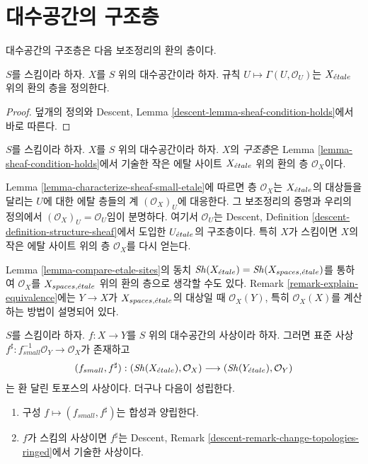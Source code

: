 \section{대수공간의 구조층}
\label{section-structure-sheaf}

\noindent
대수공간의 구조층은 다음 보조정리의 환의 층이다.

\begin{lemma}
\label{lemma-sheaf-condition-holds}
$S$를 스킴이라 하자. $X$를 $S$ 위의 대수공간이라 하자.
규칙 $U \mapsto \Gamma(U, \mathcal{O}_U)$는
$X_{\acute{e}tale}$ 위의 환의 층을 정의한다.
\end{lemma}

\begin{proof}
덮개의 정의와 Descent, Lemma
\ref{descent-lemma-sheaf-condition-holds}에서 바로 따른다.
\end{proof}

\begin{definition}
\label{definition-structure-sheaf}
$S$를 스킴이라 하자.
$X$를 $S$ 위의 대수공간이라 하자.
$X$의 {\it 구조층}은 Lemma \ref{lemma-sheaf-condition-holds}에서
기술한 작은 에탈 사이트 $X_{\acute{e}tale}$ 위의 환의 층
$\mathcal{O}_X$이다.
\end{definition}

\noindent
Lemma \ref{lemma-characterize-sheaf-small-etale}에 따르면
층 $\mathcal{O}_X$는 $X_{\acute{e}tale}$의 대상들을 달리는 $U$에 대한
에탈 층들의 계 $(\mathcal{O}_X)_U$에 대응한다.
그 보조정리의 증명과 우리의 정의에서
$(\mathcal{O}_X)_U = \mathcal{O}_U$임이 분명하다.
여기서 $\mathcal{O}_U$는 Descent, Definition
\ref{descent-definition-structure-sheaf}에서 도입한
$U_{\acute{e}tale}$의 구조층이다. 특히 $X$가 스킴이면
$X$의 작은 에탈 사이트 위의 층 $\mathcal{O}_X$를 다시 얻는다.

\medskip\noindent
Lemma \ref{lemma-compare-etale-sites}의 동치
$\mathop{\mathit{Sh}}\nolimits(X_{\acute{e}tale}) = \mathop{\mathit{Sh}}\nolimits(X_{spaces, {\acute{e}tale}})$를 통하여
$\mathcal{O}_X$를 $X_{spaces, {\acute{e}tale}}$ 위의 환의 층으로
생각할 수도 있다. Remark \ref{remark-explain-equivalence}에는
$Y \to X$가 $X_{spaces, {\acute{e}tale}}$의 대상일 때
$\mathcal{O}_X(Y)$, 특히 $\mathcal{O}_X(X)$를 계산하는 방법이
설명되어 있다.

\begin{lemma}
\label{lemma-morphism-ringed-topoi}
$S$를 스킴이라 하자.
$f : X \to Y$를 $S$ 위의 대수공간의 사상이라 하자.
그러면 표준 사상
$f^\sharp : f_{small}^{-1}\mathcal{O}_Y \to \mathcal{O}_X$가 존재하고
$$
(f_{small}, f^\sharp) :
(\mathop{\mathit{Sh}}\nolimits(X_{\acute{e}tale}), \mathcal{O}_X)
\longrightarrow
(\mathop{\mathit{Sh}}\nolimits(Y_{\acute{e}tale}), \mathcal{O}_Y)
$$
는 환 달린 토포스의 사상이다. 더구나 다음이 성립한다.
\begin{enumerate}
\item 구성 $f \mapsto (f_{small}, f^\sharp)$는 합성과 양립한다.
\item $f$가 스킴의 사상이면 $f^\sharp$는 Descent, Remark
\ref{descent-remark-change-topologies-ringed}에서 기술한 사상이다.
\end{enumerate}
\end{lemma}

